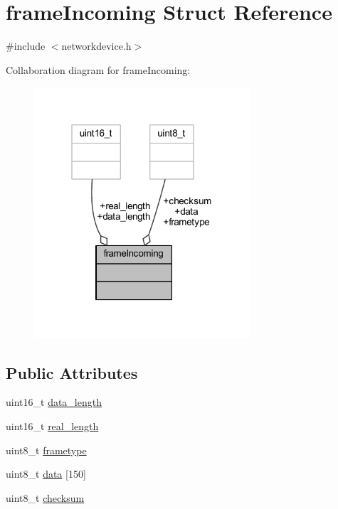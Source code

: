 \hypertarget{structframe_incoming}{}\section{frame\+Incoming Struct Reference}
\label{structframe_incoming}


{\ttfamily \#include $<$networkdevice.\+h$>$}



Collaboration diagram for frame\+Incoming\+:
\nopagebreak
\begin{figure}[H]
\begin{center}
\leavevmode
\includegraphics[width=229pt]{structframe_incoming__coll__graph}
\end{center}
\end{figure}
\subsection*{Public Attributes}
\begin{DoxyCompactItemize}
\item 
uint16\+\_\+t \hyperlink{structframe_incoming_a74bdada5ea5e72403e6d350c7ce100b7}{data\+\_\+length}
\item 
uint16\+\_\+t \hyperlink{structframe_incoming_ab3c01fe000d5c79de04c5a3bcbdc8c9d}{real\+\_\+length}
\item 
uint8\+\_\+t \hyperlink{structframe_incoming_a3f025c55a8834939da2ff261b4d896c6}{frametype}
\item 
uint8\+\_\+t \hyperlink{structframe_incoming_a7540149370e29f6b639bffc0f18b3b07}{data} \mbox{[}150\mbox{]}
\item 
uint8\+\_\+t \hyperlink{structframe_incoming_abc6bcaee3bb13564b77f0d71b218c8e9}{checksum}
\end{DoxyCompactItemize}


